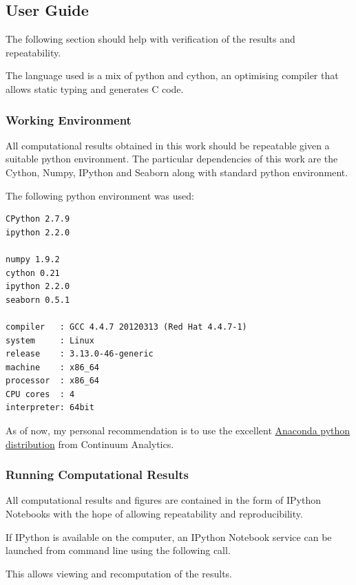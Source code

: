 \documentclass{article} %
\begin{document}
\subsection{User Guide}
\label{user_guide}

The following section should help with verification of the results and repeatability.\newline

The language used is a mix of python and cython, an optimising compiler that allows static typing and generates C code.


\subsubsection{Working Environment}
All computational results obtained in this work should be repeatable given a suitable python environment. The particular dependencies of this work are the Cython, Numpy, IPython and Seaborn along with standard python environment.\newline

The following python environment was used:

\begin{verbatim}
CPython 2.7.9
ipython 2.2.0

numpy 1.9.2
cython 0.21
ipython 2.2.0
seaborn 0.5.1

compiler   : GCC 4.4.7 20120313 (Red Hat 4.4.7-1)
system     : Linux
release    : 3.13.0-46-generic
machine    : x86_64
processor  : x86_64
CPU cores  : 4
interpreter: 64bit

\end{verbatim}

As of now, my personal recommendation is to use the excellent \href{http://continuum.io/downloads}{Anaconda python distribution} from Continuum Analytics.


\subsubsection{Running Computational Results}

All computational results and figures are contained in the form of IPython Notebooks with the hope of allowing repeatability and reproducibility.


If IPython is available on the computer, an IPython Notebook service can be launched from command line using the following call.


This allows viewing and recomputation of the results.\newline
\end{document}
